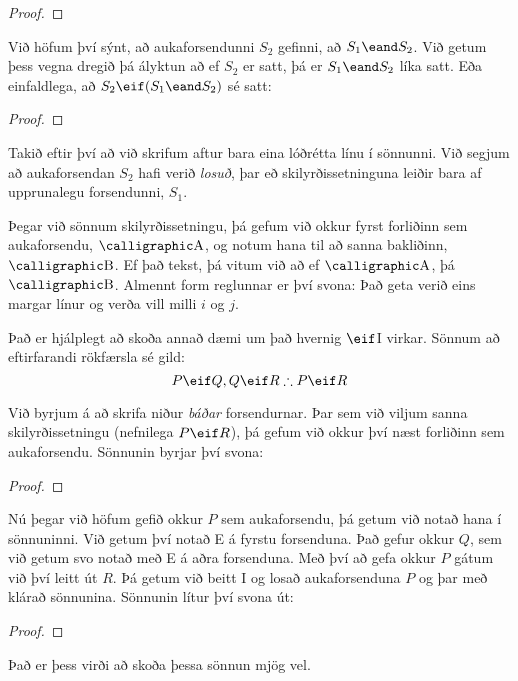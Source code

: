 	\begin{proof}
		\open
	\end{proof}
Við höfum því sýnt, að aukaforsendunni $S_2$ gefinni, að $S_1 \eand S_2$. Við getum þess vegna dregið þá ályktun að ef $S_2$ er satt, þá er $S_1 \eand S_2$ líka satt. Eða einfaldlega, að $S_2 \eif (S_1 \eand S_2)$ sé satt:
	\begin{proof}
		\open
			\close
	\end{proof}
Takið eftir því að við skrifum aftur bara eina lóðrétta línu í sönnunni. Við segjum að aukaforsendan $S_2$ hafi verið \emph{losuð}, þar eð skilyrðissetninguna leiðir bara af upprunalegu forsendunni, $S_1$.

Þegar við sönnum skilyrðissetningu, þá gefum við okkur fyrst forliðinn sem aukaforsendu, $\meta{A}$, og notum hana til að sanna bakliðinn, $\meta{B}$. Ef það tekst, þá vitum við að ef $\meta{A}$, þá $\meta{B}$. Almennt form reglunnar er því svona: 
Það geta verið eins margar línur og verða vill milli $i$ og $j$.	

Það er hjálplegt að skoða annað dæmi um það hvernig $\eif$I virkar. Sönnum að eftirfarandi rökfærsla sé gild:
	$$P \eif Q, Q \eif R \therefore P \eif R$$	

Við byrjum á að skrifa niður \emph{báðar} forsendurnar. Þar sem við viljum sanna skilyrðissetningu (nefnilega $P \eif R$), þá gefum við okkur því næst forliðinn sem aukaforsendu. Sönnunin byrjar því svona:
\begin{proof}
	\open
	\close
\end{proof}
Nú þegar við höfum gefið okkur $P$ sem aukaforsendu, þá getum við notað hana í sönnuninni. Við getum því notað {\eif}E á fyrstu forsenduna. Það gefur okkur $Q$, sem við getum svo notað með {\eif}E á aðra forsenduna. Með því að gefa okkur $P$ gátum við því leitt út $R$. Þá getum við beitt {\eif}I og losað aukaforsenduna $P$ og þar með klárað sönnunina. Sönnunin lítur því svona út:

\label{HSproof}
\begin{proof}
	\open
	\close
\end{proof} Það er þess virði að skoða þessa sönnun mjög vel.

